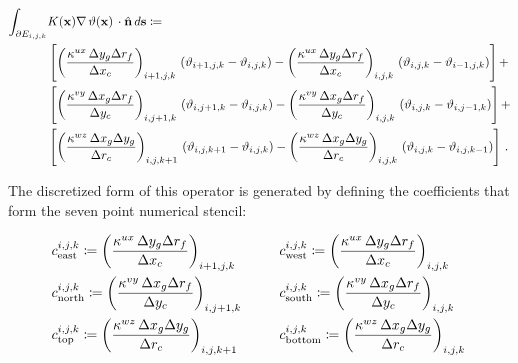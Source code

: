 \begin{linenomath*}\begin{equation}
    \begin{aligned}
        \int_{\partial E_{i,j,k}}
        &K(\mathbf{x})\nabla\,\vartheta(\mathbf{x})\,
        \cdot \hat{\mathbf{n}} \, d\mathbf{s}
        \coloneqq \\
        &\left[
            \left(
                \dfrac{\kappa^{ux} \, \Delta y_g \Delta r_f}{\Delta x_c}
            \right)_{i+1,j,k} \,
            (\vartheta_{i+1,j,k} - \vartheta_{i,j,k}) -
            \left(
                \dfrac{\kappa^{ux} \, \Delta y_g \Delta r_f}{\Delta x_c}
            \right)_{i,j,k} \,
            (\vartheta_{i,j,k} - \vartheta_{i-1,j,k})
        \right]+
        \\
        &\left[
            \left(
                \dfrac{\kappa^{vy} \, \Delta x_g \Delta r_f}{\Delta y_c}
            \right)_{i,j+1,k} \,
            (\vartheta_{i,j+1,k} - \vartheta_{i,j,k}) -
            \left(
                \dfrac{\kappa^{vy} \, \Delta x_g \Delta r_f}{\Delta y_c}
            \right)_{i,j,k} \,
            (\vartheta_{i,j,k} - \vartheta_{i,j-1,k})
        \right]+
        \\
        &\left[
            \left(
                \dfrac{\kappa^{wz} \, \Delta x_g \Delta y_g}{\Delta r_c}
            \right)_{i,j,k+1} \,
            (\vartheta_{i,j,k+1} - \vartheta_{i,j,k}) -
            \left(
                \dfrac{\kappa^{wz} \, \Delta x_g \Delta y_g}{\Delta r_c}
            \right)_{i,j,k} \,
            (\vartheta_{i,j,k} - \vartheta_{i,j,k-1})
        \right]
        \, .
    \end{aligned}
    \label{eq:big_laplacian}
\end{equation}\end{linenomath*}
The discretized form of this operator is generated by defining the coefficients
that form the seven point numerical stencil:
\begin{linenomath*}\begin{equation*}
    \begin{aligned}
        &c_\text{east}^{i,j,k} \coloneqq
            \left(
                \dfrac{\kappa^{ux} \, \Delta y_g \Delta r_f}{\Delta x_c}
            \right)_{i+1,j,k} \,
        \qquad
        &&c_\text{west}^{i,j,k} \coloneqq
            \left(
                \dfrac{\kappa^{ux} \, \Delta y_g \Delta r_f}{\Delta x_c}
            \right)_{i,j,k} \,
        \\
        &c_\text{north}^{i,j,k} \coloneqq
            \left(
                \dfrac{\kappa^{vy} \, \Delta x_g \Delta r_f}{\Delta y_c}
            \right)_{i,j+1,k} \,
        &&c_\text{south}^{i,j,k} \coloneqq
            \left(
                \dfrac{\kappa^{vy} \, \Delta x_g \Delta r_f}{\Delta y_c}
            \right)_{i,j,k} \,
        \\
        &c_\text{top}^{i,j,k} \coloneqq
            \left(
                \dfrac{\kappa^{wz} \, \Delta x_g \Delta y_g}{\Delta r_c}
            \right)_{i,j,k+1} \,
        &&c_\text{bottom}^{i,j,k} \coloneqq
            \left(
                \dfrac{\kappa^{wz} \, \Delta x_g \Delta y_g}{\Delta r_c}
            \right)_{i,j,k} \,
    \end{aligned}
\end{equation*}\end{linenomath*}
